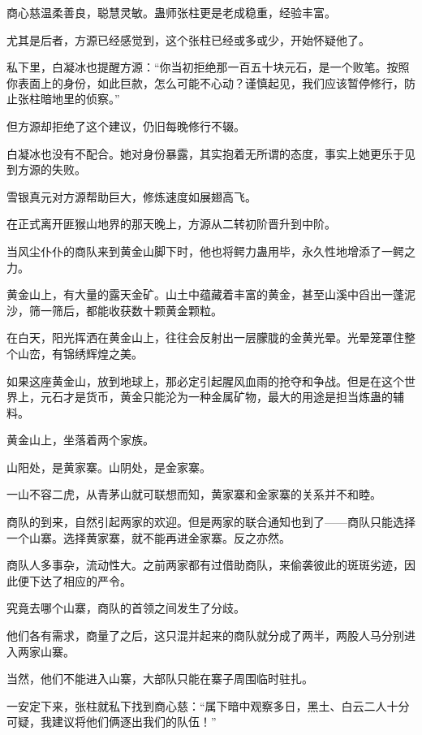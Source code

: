 \begin{this_body}
商心慈温柔善良，聪慧灵敏。蛊师张柱更是老成稳重，经验丰富。

尤其是后者，方源已经感觉到，这个张柱已经或多或少，开始怀疑他了。

私下里，白凝冰也提醒方源：“你当初拒绝那一百五十块元石，是一个败笔。按照你表面上的身份，如此巨款，怎么可能不心动？谨慎起见，我们应该暂停修行，防止张柱暗地里的侦察。”

但方源却拒绝了这个建议，仍旧每晚修行不辍。

白凝冰也没有不配合。她对身份暴露，其实抱着无所谓的态度，事实上她更乐于见到方源的失败。

雪银真元对方源帮助巨大，修炼速度如展翅高飞。

在正式离开匪猴山地界的那天晚上，方源从二转初阶晋升到中阶。

当风尘仆仆的商队来到黄金山脚下时，他也将鳄力蛊用毕，永久性地增添了一鳄之力。

黄金山上，有大量的露天金矿。山土中蕴藏着丰富的黄金，甚至山溪中舀出一蓬泥沙，筛一筛后，都能收获数十颗黄金颗粒。

在白天，阳光挥洒在黄金山上，往往会反射出一层朦胧的金黄光晕。光晕笼罩住整个山峦，有锦绣辉煌之美。

如果这座黄金山，放到地球上，那必定引起腥风血雨的抢夺和争战。但是在这个世界上，元石才是货币，黄金只能沦为一种金属矿物，最大的用途是担当炼蛊的辅料。

黄金山上，坐落着两个家族。

山阳处，是黄家寨。山阴处，是金家寨。

一山不容二虎，从青茅山就可联想而知，黄家寨和金家寨的关系并不和睦。

商队的到来，自然引起两家的欢迎。但是两家的联合通知也到了——商队只能选择一个山寨。选择黄家寨，就不能再进金家寨。反之亦然。

商队人多事杂，流动性大。之前两家都有过借助商队，来偷袭彼此的斑斑劣迹，因此便下达了相应的严令。

究竟去哪个山寨，商队的首领之间发生了分歧。

他们各有需求，商量了之后，这只混并起来的商队就分成了两半，两股人马分别进入两家山寨。

当然，他们不能进入山寨，大部队只能在寨子周围临时驻扎。

一安定下来，张柱就私下找到商心慈：“属下暗中观察多日，黑土、白云二人十分可疑，我建议将他们俩逐出我们的队伍！”

\end{this_body}

